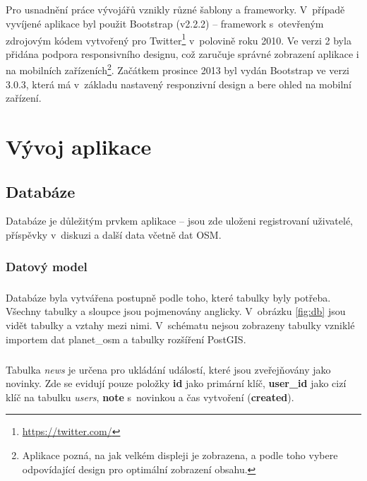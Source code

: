 \documentclass[11pt,a4paper,titlepage,oneside]{book}
\begin{document}

		\paragraph{} Pro usnadnění práce vývojářů vznikly různé šablony a frameworky. V~pří\-padě vyvíjené aplikace byl použit Bootstrap (v2.2.2) -- framework s~otevřeným zdrojovým kódem vytvořený pro Twitter\footnote{\url{https://twitter.com/}} v~polovině roku 2010. Ve verzi 2 byla přidána podpora responsivního designu, což zaručuje správné zobrazení aplikace i na mobilních zařízeních\footnote{Aplikace pozná, na jak velkém displeji je zobrazena, a podle toho vybere odpovídající design pro optimální zobrazení obsahu.}. Začátkem prosince 2013 byl vydán Bootstrap ve verzi 3.0.3, která má v~základu nastavený responzivní design a bere ohled na mobilní zařízení.
\chapter{Vývoj aplikace}
		\section{Databáze}
Databáze je důležitým prvkem aplikace  -- jsou zde uloženi registrovaní uživatelé, příspěvky v~diskuzi a další data včetně dat \ac{OSM}.
			\subsection{Datový model}
				\paragraph{}  Databáze byla vytvářena postupně podle toho, které tabulky byly potřeba. Všechny tabulky a sloupce jsou pojmenovány anglicky. V~obrázku \ref{fig:db} jsou vidět tabulky a vztahy mezi nimi. V~schématu nejsou zobrazeny tabulky vzniklé importem dat planet\_osm a tabulky rozšíření PostGIS. 
				\paragraph{}Tabulka \textit{news} je určena pro ukládání událostí, které jsou zveřejňovány jako novinky. Zde se evidují pouze položky \textbf{id} jako primární klíč, \textbf{user\_id} jako cizí klíč na tabulku \textit{users}, \textbf{note} s~novinkou a čas vytvoření (\textbf{created}).
\end{document}
